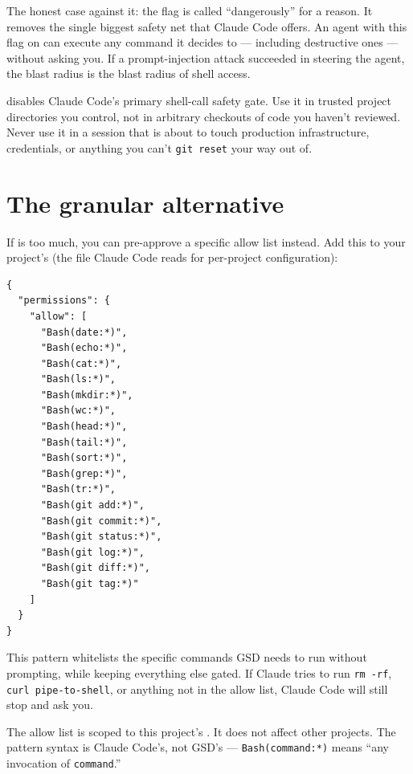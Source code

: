 \documentclass[11pt,letterpaper,openany]{book}
\begin{document}
The honest case against it: the flag is called ``dangerously'' for a reason. It removes the single biggest safety net that Claude Code offers. An agent with this flag on can execute any command it decides to --- including destructive ones --- without asking you. If a prompt-injection attack succeeded in steering the agent, the blast radius is the blast radius of shell access.

\begin{gsdimportant}
 disables Claude Code's primary shell-call safety gate. Use it in trusted project directories you control, not in arbitrary checkouts of code you haven't reviewed. Never use it in a session that is about to touch production infrastructure, credentials, or anything you can't \texttt{git reset} your way out of.
\end{gsdimportant}

\section{The granular alternative}

If  is too much, you can pre-approve a specific allow list instead. Add this to your project's  (the file Claude Code reads for per-project configuration):

\begin{lstlisting}
{
  "permissions": {
    "allow": [
      "Bash(date:*)",
      "Bash(echo:*)",
      "Bash(cat:*)",
      "Bash(ls:*)",
      "Bash(mkdir:*)",
      "Bash(wc:*)",
      "Bash(head:*)",
      "Bash(tail:*)",
      "Bash(sort:*)",
      "Bash(grep:*)",
      "Bash(tr:*)",
      "Bash(git add:*)",
      "Bash(git commit:*)",
      "Bash(git status:*)",
      "Bash(git log:*)",
      "Bash(git diff:*)",
      "Bash(git tag:*)"
    ]
  }
}
\end{lstlisting}

This pattern whitelists the specific commands GSD needs to run without prompting, while keeping everything else gated. If Claude tries to run \texttt{rm -rf}, \texttt{curl pipe-to-shell}, or anything not in the allow list, Claude Code will still stop and ask you.

The allow list is scoped to this project's . It does not affect other projects. The pattern syntax is Claude Code's, not GSD's --- \texttt{Bash(command:*)} means ``any invocation of \texttt{command}.''
\end{document}
